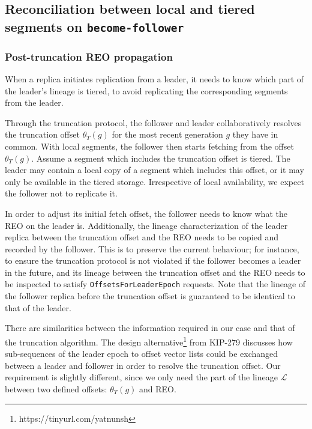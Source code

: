 \documentclass{article}
\newcommand*\circled[1]{\tikz[baseline=(char.base)]{
		\node[shape=circle,draw,inner sep=1pt] (char) {#1};}}
\begin{document}
\subsection{Reconciliation between local and tiered segments on \texttt{become-follower}}

\subsubsection{Post-truncation REO propagation}

When a replica initiates replication from a leader, it needs to know which part of the leader's lineage is tiered, to avoid replicating the corresponding segments from the leader.

Through the truncation protocol, the follower and leader collaboratively resolves the truncation offset $\theta_T(g)$ for the most recent generation $g$ they have in common. With local segments, the follower then starts fetching from the offset $\theta_T(g)$. Assume a segment which includes the truncation offset is tiered. The leader may contain a local copy of a segment which includes this offset, or it may only be available in the tiered storage. Irrespective of local availability, we expect the follower not to replicate it.

In order to adjust its initial fetch offset, the follower needs to know what the REO on the leader is. Additionally, the lineage characterization of the leader replica between the truncation offset and the REO needs to be copied and recorded by the follower. This is to preserve the current behaviour; for instance, to ensure the truncation protocol is not violated if the follower becomes a leader in the future, and its lineage between the truncation offset and the REO needs to be inspected to satisfy \texttt{OffsetsForLeaderEpoch} requests. Note that the lineage of the follower replica before the truncation offset is guaranteed to be identical to that of the leader.

There are similarities between the information required in our case and that of the truncation algorithm. The design alternative\footnote{https://tinyurl.com/yatnunsh} \circled{2} from KIP-279 \cite{KIP279} discusses how sub-sequences of the leader epoch to offset vector lists could be exchanged between a leader and follower in order to resolve the truncation offset. Our requirement is slightly different, since we only need the part of the lineage $\mathcal{L}$ between two defined offsets: $\theta_T(g)$ and REO.
\end{document}
